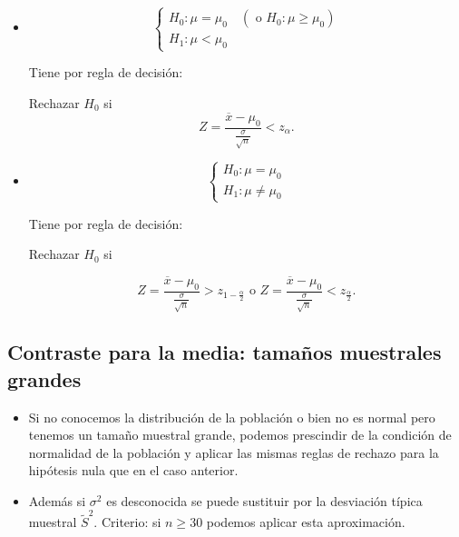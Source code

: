 \begin{frame}
\begin{itemize}
 \item  $$\left\{\begin{array}{l}
    H_{0}:\mu=\mu_{0} \quad (\mbox{ o } H_{0}:\mu\geq \mu_{0})\\
    H_{1}:\mu<\mu_{0}
    \end{array}\right.$$


    Tiene por regla de decisión:

    Rechazar $H_{0}$ si
    $$Z=
    \frac{\overline{x}-\mu_{0}}{\frac{\sigma}{\sqrt{n}}}<z_{\alpha}.$$

\item  $$\left\{\begin{array}{l}
    H_{0}:\mu=\mu_{0} \\
    H_{1}:\mu\not=\mu_{0}
    \end{array}\right.$$


    Tiene por regla de decisión:

    Rechazar $H_{0}$ si

    $$Z=
    \frac{\overline{x}-\mu_{0}}
    {\frac{\sigma}{\sqrt{n}}}>z_{1-\frac{\alpha}{2}}\mbox{ o }  Z=
    \frac{\overline{x}-\mu_{0}}
    {\frac{\sigma}{\sqrt{n}}}<z_{\frac{\alpha}{2}}.$$
\end{itemize}
\end{frame}

\begin{frame}
\section{Contraste para la media: tamaños muestrales grandes}

\begin{itemize}
\item Si no conocemos la distribución de la población o bien no es normal pero tenemos un tamaño muestral grande, podemos prescindir de la condición de normalidad de la población y aplicar las mismas reglas de rechazo para la hipótesis nula que en el caso anterior.
\item  Además si $\sigma^2$ es desconocida se puede sustituir por la desviación típica muestral $\tilde{S}^2$. Criterio: si $n\geq 30$ podemos aplicar esta aproximación.
\end{itemize}
\end{frame}

